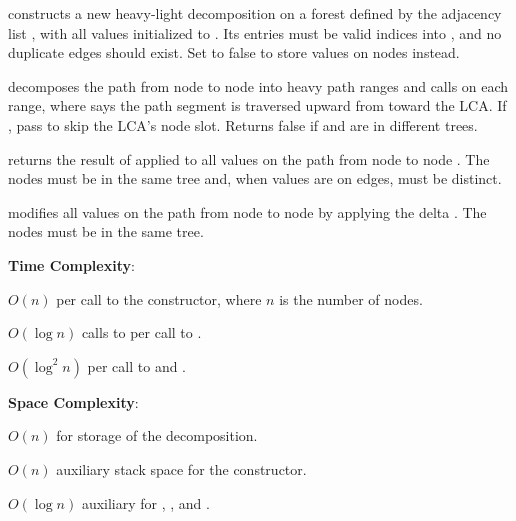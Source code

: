 \begin{compactitem}
  \item {} constructs a new heavy-light decomposition on a forest defined by the adjacency list , with all values initialized to . Its entries must be valid indices into , and no duplicate edges should exist. Set  to false to store values on nodes instead.
  \item {} decomposes the path from node  to node  into heavy path ranges and calls  on each range, where  says the path segment is traversed upward from  toward the LCA. If , pass  to skip the LCA's node slot. Returns false if  and  are in different trees.
  \item {} returns the result of  applied to all values on the path from node  to node . The nodes must be in the same tree and, when values are on edges, must be distinct.
  \item {} modifies all values on the path from node  to node  by applying the delta . The nodes must be in the same tree.
\end{compactitem}

\textbf{Time Complexity}:
\begin{compactitem}
  \item $O(n)$ per call to the constructor, where $n$ is the number of nodes.
  \item $O(\log n)$ calls to  per call to .
  \item $O(\log^{2} n)$ per call to  and .
\end{compactitem}

\textbf{Space Complexity}:
\begin{compactitem}
  \item $O(n)$ for storage of the decomposition.
  \item $O(n)$ auxiliary stack space for the constructor.
  \item $O(\log n)$ auxiliary for , , and .
\end{compactitem}

